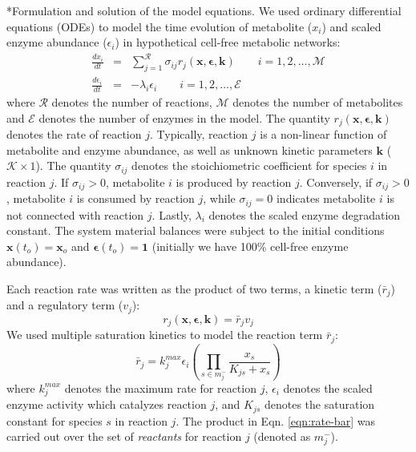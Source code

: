 \documentclass[12pt]{article}
\makeatletter
\renewcommand\subsection{\@startsection
	{subsection}{2}{0mm}
	{-0.05in}
	{-0.5\baselineskip}
	{\normalfont\normalsize\bfseries}}
\makeatother
\begin{document}
\subsection*{Formulation and solution of the model equations.}
We used ordinary differential equations (ODEs) to model the time evolution of metabolite ($x_{i}$) and scaled enzyme abundance ($\epsilon_{i}$) in hypothetical cell-free metabolic networks:
\begin{eqnarray}
	\frac{dx_{i}}{dt} & = & \sum_{j = 1}^{\mathcal{R}}\sigma_{ij}r_{j}\left(\mathbf{x},\mathbf{\epsilon},\mathbf{k}\right)\qquad{i=1,2,\hdots,\mathcal{M}}\\
	\frac{d\epsilon_{i}}{dt} & = & -\lambda_{i}\epsilon_{i}\qquad{i = 1,2,\hdots,\mathcal{E}}
\end{eqnarray}where $\mathcal{R}$ denotes the number of reactions, $\mathcal{M}$ denotes the number of metabolites and $\mathcal{E}$ denotes the number of enzymes in the model. 
The quantity $r_{j}\left(\mathbf{x},\mathbf{\epsilon},\mathbf{k}\right)$ denotes the rate of reaction $j$. 
Typically, reaction $j$ is a non-linear function of metabolite and enzyme abundance, as well as unknown kinetic parameters $\mathbf{k}$ ($\mathcal{K}\times{1}$). 
The quantity $\sigma_{ij}$ denotes the stoichiometric coefficient for species $i$ in reaction $j$. 
If $\sigma_{ij}>0$, metabolite $i$ is produced by reaction $j$. 
Conversely, if $\sigma_{ij}>0$, metabolite $i$ is consumed by reaction $j$, while $\sigma_{ij} = 0$ indicates metabolite $i$ is not connected with reaction $j$. 
Lastly, $\lambda_{i}$ denotes the scaled enzyme degradation constant. 
The system material balances were subject to the initial conditions $\mathbf{x}\left(t_{o}\right) = \mathbf{x}_{o}$ and $\mathbf{\epsilon}\left(t_{o}\right) = \mathbf{1}$ (initially we have 100\% cell-free enzyme abundance). 

Each reaction rate was written as the product of two terms, a kinetic term ($\bar{r}_{j}$) and a regulatory term ($v_{j}$):
\begin{equation}\label{eqn:rate-factor}
	r_{j}\left(\mathbf{x},\mathbf{\epsilon},\mathbf{k}\right) = \bar{r}_{j}v_{j}
\end{equation}
We used multiple saturation kinetics to model the reaction term $\bar{r}_{j}$:
\begin{equation}\label{eqn:rate-bar}
	\bar{r}_{j} = k_{j}^{max}\epsilon_{i}\left(\prod_{s\in{m_{j}^{-}}}\frac{x_{s}}{K_{js} + x_{s}}\right)
\end{equation}where $k_{j}^{max}$ denotes the maximum rate for reaction $j$, $\epsilon_{i}$ denotes the scaled enzyme activity which catalyzes reaction $j$, and
$K_{js}$ denotes the saturation constant for species $s$ in reaction $j$. 
The product in Eqn. \eqref{eqn:rate-bar} was carried out over the set of \textit{reactants} for reaction $j$ (denoted as $m_{j}^{-}$). 
\end{document}
